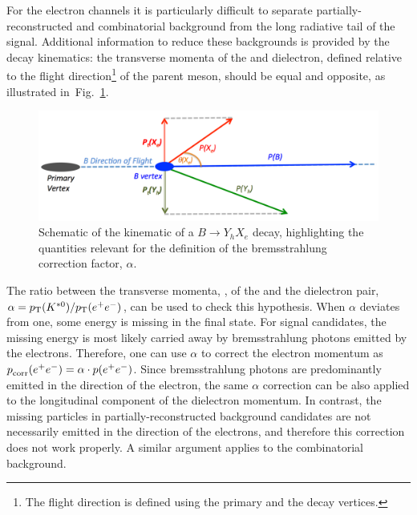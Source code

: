 For the electron channels it is particularly difficult to separate partially-reconstructed and combinatorial background from the 
long radiative tail of the signal. Additional information to reduce these backgrounds is provided by the decay kinematics: 
the transverse momenta of the \Kstarz and dielectron, defined relative to the flight direction\footnote{The flight direction is defined 
using the primary and the decay vertices.} of the parent \Bz meson, should be equal and opposite, as illustrated \mbox{in Fig.~\ref{fig:schemaHOP}}.
\begin{figure}[b]
 \centering
    \includegraphics[width=0.9\linewidth]{RKst/figs/HOP/schemaHOP.pdf}
  \caption{ Schematic of the kinematic of a $B \to Y_h X_e$ decay, highlighting the quantities relevant for the 
  definition of the bremsstrahlung correction factor, $\alpha$.}
  \label{fig:schemaHOP}
\end{figure}

The ratio between the transverse momenta, \pt, of the \Kstarz and the dielectron pair, $\alpha = \mbox{$p_{\rm T}$}({{K}^{*0}}) / \mbox{$p_{\rm T}$}(e^+ e^-)$, can be used 
to check this hypothesis. When $\alpha$ deviates from one, some energy is missing in the final state. 
For signal candidates, the missing energy is most likely carried away by bremsstrahlung photons emitted
by the electrons. Therefore, one can use $\alpha$ to correct the electron momentum as $\mbox{$p$}_{\textrm{corr}}(e^+ e^-) = \alpha \cdot \mbox{$p$}(e^+ e^-)$.
Since bremsstrahlung photons are predominantly emitted in the direction of the electron, the same $\alpha$ correction can
be also applied to the longitudinal component of the dielectron momentum.
In contrast, the missing particles in partially-reconstructed background candidates are not necessarily emitted in the
direction of the electrons, and therefore this correction does not work properly.
A similar argument applies to the combinatorial background. 

